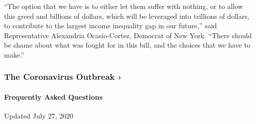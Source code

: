 ``The option that we have is to either let them suffer with nothing, or
to allow this greed and billions of dollars, which will be leveraged
into trillions of dollars, to contribute to the largest income
inequality gap in our future,'' said Representative Alexandria
Ocasio-Cortez, Democrat of New York. ``There should be shame about what
was fought for in this bill, and the choices that we have to make.''

\href{https://www.nytimes.com/news-event/coronavirus?action=click\&pgtype=Article\&state=default\&region=MAIN_CONTENT_3\&context=storylines_faq}{}

\hypertarget{the-coronavirus-outbreak-}{%
\subsubsection{The Coronavirus Outbreak
›}\label{the-coronavirus-outbreak-}}

\hypertarget{frequently-asked-questions}{%
\paragraph{Frequently Asked
Questions}\label{frequently-asked-questions}}

Updated July 27, 2020

